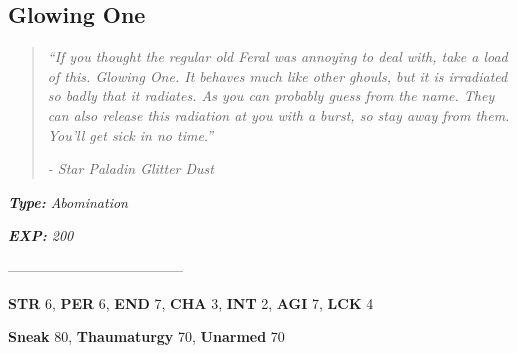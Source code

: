 \documentclass[11pt,a4paper,twocolumn]{book}
\begin{document}
	\subsection*{Glowing One}
	\begin{quote}
		\emph{``If you thought the regular old Feral was annoying to deal with, take a load of this. Glowing One. It behaves much like other ghouls, but it is irradiated so badly that it radiates. As you can probably guess from the name. They can also release this radiation at you with a burst, so stay away from them. You'll get sick in no time.''}
		
		\emph{-	Star Paladin Glitter Dust}
	\end{quote}
	
	\noindent
	\emph{\textbf{Type:} Abomination}
	
	\noindent
	\emph{\textbf{EXP:} 200}
	
%		
%	
%		

	--------------------------------------
	
	\noindent
	\textbf{STR} 6, \textbf{PER} 6, \textbf{END} 7, \textbf{CHA} 3, \textbf{INT} 2, \textbf{AGI} 7, \textbf{LCK} 4
	
	\noindent
	\textbf{Sneak} 80, \textbf{Thaumaturgy} 70, \textbf{Unarmed} 70
	
\end{document}
